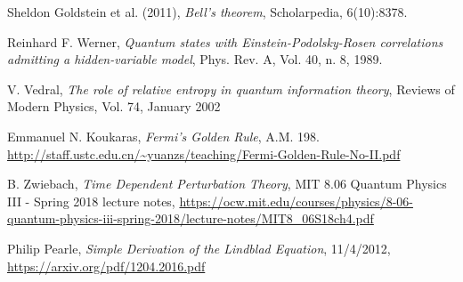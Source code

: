 \documentclass[12pt]{report} %
\theoremstyle{plain}
\theoremstyle{definition}
\theoremstyle{remark}
\begin{document}
\begin{thebibliography}{9}
Sheldon Goldstein et al. (2011), \textit{Bell's theorem}, 
Scholarpedia, 6(10):8378.

Reinhard F. Werner, \textit{Quantum states with Einstein-Podolsky-Rosen correlations admitting a hidden-variable model}, Phys. Rev. A, Vol. 40, n. 8, 1989.

V. Vedral, \textit{The role of relative entropy in quantum information theory}, Reviews of Modern Physics, Vol. 74, January 2002

Emmanuel N. Koukaras, \textit{Fermi's Golden Rule}, A.M. 198. \url{http://staff.ustc.edu.cn/~yuanzs/teaching/Fermi-Golden-Rule-No-II.pdf}

B. Zwiebach, \textit{Time Dependent Perturbation Theory}, MIT 8.06 Quantum Physics III - Spring 2018 lecture notes, \url{https://ocw.mit.edu/courses/physics/8-06-quantum-physics-iii-spring-2018/lecture-notes/MIT8_06S18ch4.pdf}

Philip Pearle, \textit{Simple Derivation of the Lindblad Equation}, 11/4/2012,  \url{https://arxiv.org/pdf/1204.2016.pdf}
\end{thebibliography}

\printindex
\end{document}
